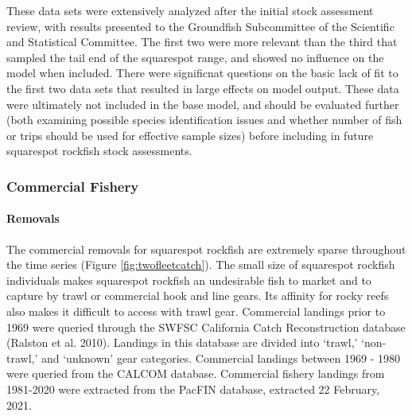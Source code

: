 \documentclass[11pt,
  english,
  a4paper,
]{article}
\begin{document}
\leavevmode\tagmcend\tagstructend\par


These data sets were extensively analyzed after the initial stock assessment review, with results presented to the Groundfish Subcommittee of the Scientific and Statistical Committee. The first two were more relevant than the third that sampled the tail end of the squarespot range, and showed no influence on the model when included. There were significnat questions on the basic lack of fit to the first two data sets that resulted in large effects on model output. These data were ultimately not included in the base model, and should be evaluated further (both examining possible species identification issues and whether number of fish or trips should be used for effective sample sizes) before including in future squarespot rockfish stock assessments.

\leavevmode\tagmcend\tagstructend\par


\hypertarget{commercial-fishery}{%
\subsubsection{Commercial Fishery}\label{commercial-fishery}}

\leavevmode\tagmcend\tagstructend


\hypertarget{removals-1}{%
\paragraph{Removals}\label{removals-1}}

\leavevmode\tagmcend\tagstructend


The commercial removals for squarespot rockfish are extremely sparse throughout the time series (Figure \ref{fig:twofleetcatch}). The small size of squarespot rockfish individuals makes squarespot rockfish an undesirable fish to market and to capture by trawl or commercial hook and line gears. Its affinity for rocky reefs also makes it difficult to access with trawl gear. Commercial landings prior to 1969 were queried through the SWFSC California Catch Reconstruction database {(Ralston et al. 2010)\leavevmode\tagmcend\tagstructend}. Landings in this database are divided into `trawl,' `non-trawl,' and `unknown' gear categories. Commercial landings between 1969 - 1980 were queried from the CALCOM database. Commercial fishery landings from 1981-2020 were extracted from the PacFIN database, extracted 22 February, 2021.
\end{document}
